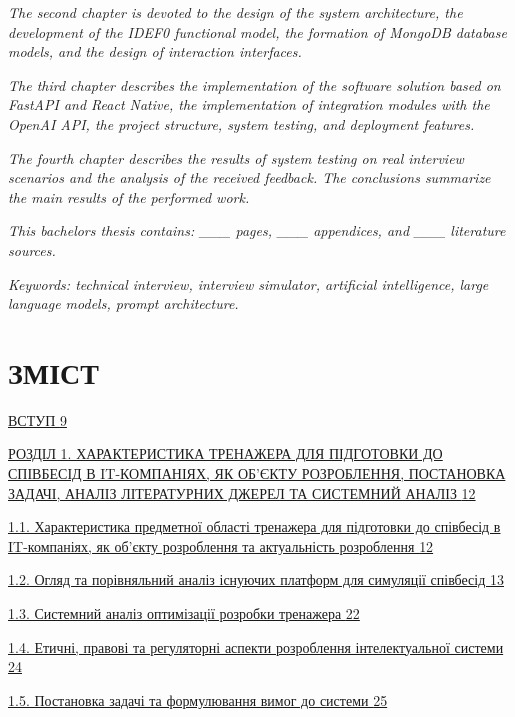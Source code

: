 \emph{The second chapter is devoted to the design of the system
architecture, the development of the IDEF0 functional model, the
formation of MongoDB database models, and the design of interaction
interfaces.}

\emph{The third chapter describes the implementation of the software
solution based on FastAPI and React Native, the implementation of
integration modules with the OpenAI API, the project structure, system
testing, and deployment features.}

\emph{The fourth chapter describes the results of system testing on real
interview scenarios and the analysis of the received feedback. The
conclusions summarize the main results of the performed work.}

\emph{This bachelor\textquotesingle s thesis contains: \_\_\_ pages,
\_\_\_ appendices, and \_\_\_ literature sources.}

\emph{Keywords: technical interview, interview simulator, artificial
intelligence, large language models, prompt architecture.}

\section{\texorpdfstring{\textbf{ЗМІСТ}}{ЗМІСТ}}\label{ux437ux43cux456ux441ux442}

\hyperref[_Toc228981050]{ВСТУП \hyperref[_Toc228981050]{9}}

\hyperref[_heading=h.5iej67xrqf5j]{РОЗДІЛ 1. ХАРАКТЕРИСТИКА ТРЕНАЖЕРА
ДЛЯ ПІДГОТОВКИ ДО СПІВБЕСІД В IT-КОМПАНІЯХ, ЯК ОБ'ЄКТУ РОЗРОБЛЕННЯ,
ПОСТАНОВКА ЗАДАЧІ, АНАЛІЗ ЛІТЕРАТУРНИХ ДЖЕРЕЛ ТА СИСТЕМНИЙ АНАЛІЗ
\hyperref[_heading=h.5iej67xrqf5j]{12}}

\hyperref[_heading=h.de52ojbplqdx]{1.1. Характеристика предметної
області тренажера для підготовки до співбесід в IT-компаніях, як об'єкту
розроблення та актуальність розроблення
\hyperref[_heading=h.de52ojbplqdx]{12}}

\hyperref[_Toc228981053]{1.2. Огляд та порівняльний аналіз існуючих
платформ для симуляції співбесід \hyperref[_Toc228981053]{13}}

\hyperref[_Toc228981054]{1.3. Системний аналіз оптимізації розробки
тренажера \hyperref[_Toc228981054]{22}}

\hyperref[_Toc228981055]{1.4. Етичні, правові та регуляторні аспекти
розроблення інтелектуальної системи \hyperref[_Toc228981055]{24}}

\hyperref[_Toc228981056]{1.5. Постановка задачі та формулювання вимог до
системи \hyperref[_Toc228981056]{25}}

